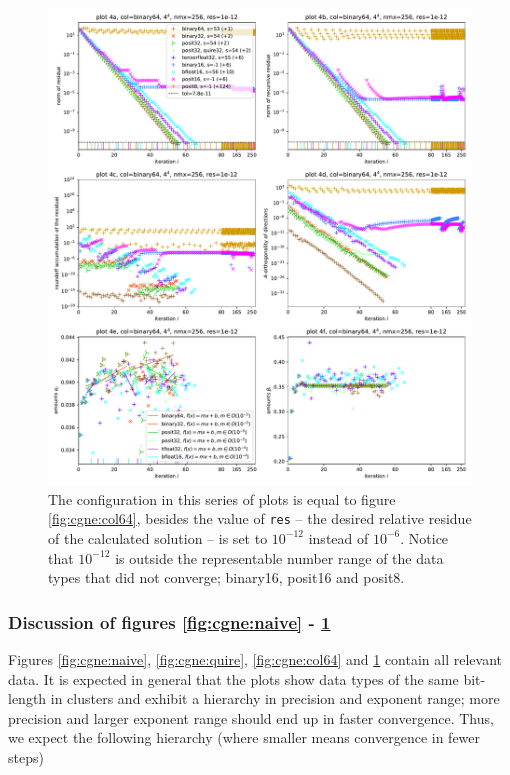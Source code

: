 \documentclass{article}
\theoremstyle{plain} %
\theoremstyle{convention} %
\theoremstyle{remark} %
\def\code#1{\texttt{#1}}
\numberwithin{equation}{section}
\begin{document}
\begin{figure}
    \centering
    \includegraphics[width=1.0\textwidth]{plots/cgne_final_3}
    \caption{The configuration in this series of plots is equal to figure \ref{fig:cgne:col64}, besides the value of \code{res} -- the desired relative residue of the calculated solution -- is set to $10^{-12}$ instead of $10^{-6}$. Notice that $10^{-12}$ is outside the representable number range of the data types that did not converge; \gls{binary16}, \gls{posit16} and \gls{posit8}.}
    \label{fig:cgne:res12}
\end{figure}

\subsubsection{Discussion of figures \ref{fig:cgne:naive} - \ref{fig:cgne:res12}}

Figures \ref{fig:cgne:naive}, \ref{fig:cgne:quire}, \ref{fig:cgne:col64} and \ref{fig:cgne:res12} contain all relevant data. It is expected in general that the plots show data types of the same bit-length in clusters and exhibit a hierarchy in precision and exponent range; more precision and larger exponent range should end up in faster convergence. Thus, we expect the following hierarchy (where smaller means convergence in fewer steps)
\end{document}
